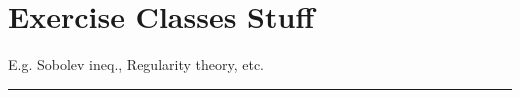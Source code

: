 

\vspace{-1em}

\section{\texorpdfstring{\color{forestgreen(web)}Exercise Classes Stuff}{}}


E.g. Sobolev ineq., Regularity theory, etc.

\rule{0.31\textwidth}{1pt}

\newpage